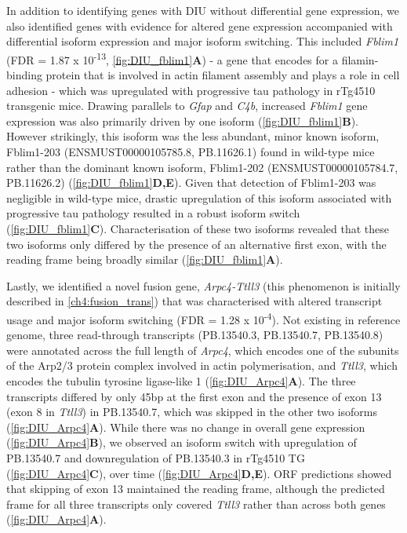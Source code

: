 In addition to identifying genes with DIU without differential gene expression, we also identified genes with evidence for altered gene expression accompanied with differential isoform expression and major isoform switching. This included \textit{Fblim1} (FDR = 1.87 x 10\textsuperscript{-13}, \cref{fig:DIU_fblim1}\textbf{A}) - a gene that encodes for a filamin-binding protein that is involved in actin filament assembly and plays a role in cell adhesion\cite{Takafuta2003} - which was upregulated with progressive tau pathology in rTg4510 transgenic mice. Drawing parallels to \textit{Gfap} and \textit{C4b}, increased \textit{Fblim1} gene expression was also primarily driven by one isoform (\cref{fig:DIU_fblim1}\textbf{B}). However strikingly, this isoform was the less abundant, minor known isoform, Fblim1-203 (ENSMUST00000105785.8, PB.11626.1) found in wild-type mice rather than the dominant known isoform, Fblim1-202 (ENSMUST00000105784.7, PB.11626.2) (\cref{fig:DIU_fblim1}\textbf{D,E}). Given that detection of Fblim1-203 was negligible in wild-type mice, drastic upregulation of this isoform associated with progressive tau pathology resulted in a robust isoform switch (\cref{fig:DIU_fblim1}\textbf{C}). Characterisation of these two isoforms revealed that these two isoforms only differed by the presence of an alternative first exon, with the reading frame being broadly similar (\cref{fig:DIU_fblim1}\textbf{A}). 

Lastly, we identified a novel fusion gene, \textit{Arpc4-Ttll3} (this phenomenon is initially described in \cref{ch4:fusion_trans}) that was characterised with altered transcript usage and major isoform switching (FDR = 1.28 x 10\textsuperscript{-4}). Not existing in reference genome, three read-through transcripts (PB.13540.3, PB.13540.7, PB.13540.8) were annotated across the full length of \textit{Arpc4}, which encodes one of the subunits of the Arp2/3 protein complex involved in actin polymerisation, and \textit{Ttll3}, which encodes the tubulin tyrosine ligase-like 1 (\cref{fig:DIU_Arpc4}\textbf{A}). The three transcripts differed by only 45bp at the first exon and the presence of exon 13 (exon 8 in \textit{Ttll3}) in PB.13540.7, which was skipped in the other two isoforms (\cref{fig:DIU_Arpc4}\textbf{A}). While there was no change in overall gene expression (\cref{fig:DIU_Arpc4}\textbf{B}), we observed an isoform switch with upregulation of PB.13540.7 and downregulation of PB.13540.3 in rTg4510 TG (\cref{fig:DIU_Arpc4}\textbf{C}), over time (\cref{fig:DIU_Arpc4}\textbf{D,E}). ORF predictions showed that skipping of exon 13 maintained the reading frame, although the predicted frame for all three transcripts only covered \textit{Ttll3} rather than across both genes (\cref{fig:DIU_Arpc4}\textbf{A}).  

